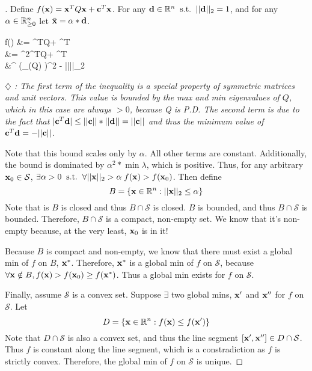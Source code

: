 \begin{proof}[]
	Define $f(\mathbf{x}) = \mathbf{x}^TQ\mathbf{x} + \mathbf{c}^T\mathbf{x}$. For any  $\mathbf{d} \in \mathbb{R}^n \;\; \text{s.t.} \;\; ||\mathbf{d}||_2 = 1$,
	and for any $\alpha \in \mathbb{R}^n_{\geq 0}$ let $\bar{\mathbf{x}} = \alpha*\mathbf{d}$.
	\begin{frml}
		f(\bx) &= \bx^TQ\bx + \vc^T\bx \\
			   &= \alpha^2\vd^TQ\vd + \alpha\vc^T\vd \\
			   &\geq^{\diamondsuit} \bigg(\min_{\lambda \in \sigma(Q)} \lambda \bigg)\alpha^2
			   - ||\vc||_2 \alpha
	\end{frml}

	\textit{$\diamondsuit$ : The first term of the inequality is a special property
	of symmetric matrices and unit vectors. This value is bounded by the max
and min eigenvalues of $Q$, which in this case are always $> 0$, because Q
is P.D. The second term is due to the fact that $| \mathbf{c}^T\mathbf{d} | \leq ||\mathbf{c}||*||\mathbf{d}||=||\mathbf{c}||$
and thus the minimum value of  $\mathbf{c}^T\mathbf{d} = -||\mathbf{c}||$.}

Note that this bound scales only by $\alpha$. All other terms are constant.
Additionally, the bound is dominated by $\alpha^2 * \min \lambda$, which is
positive.
Thus, for any arbitrary $\mathbf{x}_0 \in \mathcal{S}$, $\exists \alpha > 0 \;\; \text{s.t.} \;\; 
\forall ||\mathbf{x}||_2 > \alpha \; f(\mathbf{x}) > f(\mathbf{x}_0)$. Then define 
\[B = \{\mathbf{x} \in \mathbb{R}^n : ||\mathbf{x}||_2 \leq \alpha\}\]
Note that is $B$ is closed and thus $B \cap \mathcal{S}$ is closed. $B$ is bounded,
and thus $B \cap \mathcal{S}$ is bounded. Therefore, $B \cap \mathcal{S}$ is a
compact, non-empty set. We know that it's non-empty because, at the very least,
$\mathbf{x}_0$ is in it!

Because $B$ is compact and non-empty, we know that there must exist a global min
of $f$ on $B$, $\mathbf{x}^*$. Therefore,  $\mathbf{x}^*$ is a global min of $f$ on $\mathcal{S}$,
because $\forall \mathbf{x} \notin B, f(\mathbf{x}) > f(\mathbf{x}_0) \geq f(\mathbf{x}^*)$. Thus a global
min exists for  $f$ on $\mathcal{S}$.

Finally, assume $\mathcal{S}$ is a convex set. Suppose $\exists$ two global mins,
$\mathbf{x}'$ and $\mathbf{x}''$ for $f$ on $\mathcal{S}$. Let 
\[D = \{ \mathbf{x} \in \mathbb{R}^n : f(\mathbf{x}) \leq f(\mathbf{x}')\}\]
Note that $D \cap \mathcal{S}$ is also a convex set, and thus the line segment
$[\mathbf{x}', \mathbf{x}''] \in D \cap \mathcal{S}$. Thus $f$ is constant along the line segment,
which is a constradiction as $f$ is strictly convex. Therefore, the global min
of $f$ on $\mathcal{S}$ is unique.

\end{proof}
